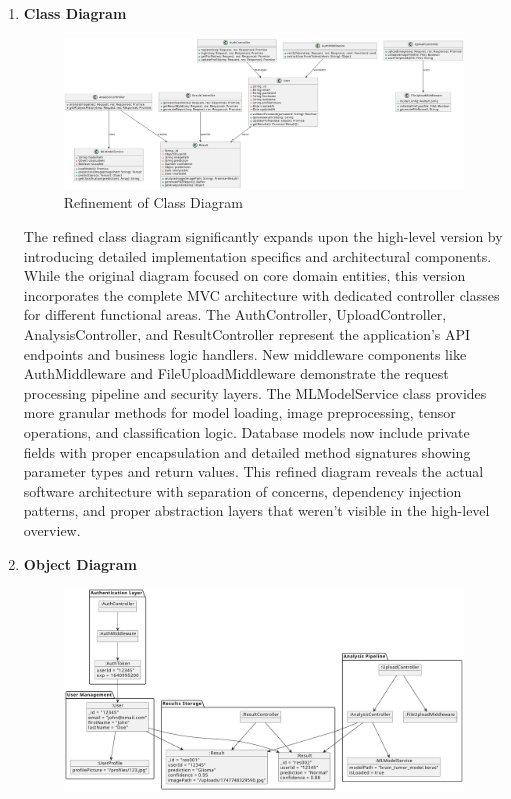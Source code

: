 \begin{enumerate}[label=\roman*.]
    \item \textbf{Class Diagram}
          \begin{center}
              \begin{figure}[H]
                  \centering
                  \includegraphics[width=1\linewidth]{Images/Refined/class.pdf}
                  \caption{Refinement of Class Diagram}
                  \label{fig:RefinementofClassDiagram}
              \end{figure}
          \end{center}
          The refined class diagram significantly expands upon the high-level version by introducing detailed implementation specifics and architectural components. While the original diagram focused on core domain entities, this version incorporates the complete MVC architecture with dedicated controller classes for different functional areas. The AuthController, UploadController, AnalysisController, and ResultController represent the application's API endpoints and business logic handlers. New middleware components like AuthMiddleware and FileUploadMiddleware demonstrate the request processing pipeline and security layers. The MLModelService class provides more granular methods for model loading, image preprocessing, tensor operations, and classification logic. Database models now include private fields with proper encapsulation and detailed method signatures showing parameter types and return values. This refined diagram reveals the actual software architecture with separation of concerns, dependency injection patterns, and proper abstraction layers that weren't visible in the high-level overview.
    \item \textbf{Object Diagram}
          \begin{center}
              \begin{figure}[H]
                  \centering
                  \includegraphics[width=1\linewidth]{Images/Refined/obj.pdf}

\end{figure}
\end{center}
\end{enumerate}

